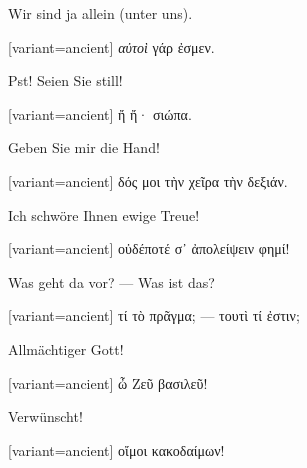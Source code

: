 Wir sind ja allein (unter uns). 

\switchcolumn

\begin{greek}[variant=ancient]%
\emph{αὐτοὶ} γάρ ἐσμεν.

\end{greek}%
\switchcolumn*

Pst! Seien Sie still! 

\switchcolumn

\begin{greek}[variant=ancient]%
ἤ ἤ· σιώπα.

\end{greek}%
\switchcolumn*

Geben Sie mir die Hand! 

\switchcolumn

\begin{greek}[variant=ancient]%
δός μοι τὴν χεῖρα τὴν δεξιάν.

\end{greek}%
\switchcolumn*

Ich schwöre Ihnen ewige Treue! 

\switchcolumn

\begin{greek}[variant=ancient]%
οὐδέποτέ σ᾽ ἀπολείψειν φημί!

\end{greek}%
Was geht da vor? — Was ist das? 

\switchcolumn

\begin{greek}[variant=ancient]%
τί τὸ πρᾶγμα; — τουτὶ τί ἐστιν;

\end{greek}%
\switchcolumn*

Allmächtiger Gott! 

\switchcolumn

\begin{greek}[variant=ancient]%
ὦ Ζεῦ βασιλεῦ!

\end{greek}%
\switchcolumn*

Verwünscht! 

\switchcolumn

\begin{greek}[variant=ancient]%
οἴμοι κακοδαίμων!

\end{greek}%
\switchcolumn*

